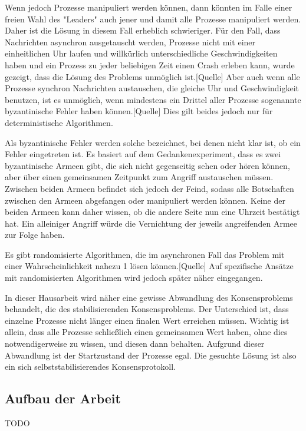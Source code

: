 \documentclass[12pt,ngerman,a4paper]{scrartcl}
\theoremstyle{plain}
\theoremstyle{definition}
\theoremstyle{remark}
\begin{document}
Wenn jedoch Prozesse manipuliert werden können, dann könnten im Falle einer freien
Wahl des "Leaders" auch jener und damit alle Prozesse manipuliert werden. Daher
ist die Lösung in diesem Fall erheblich schwieriger. Für den Fall, dass Nachrichten
asynchron ausgetauscht werden, Prozesse nicht mit einer einheitlichen Uhr
laufen und willkürlich unterschiedliche Geschwindigkeiten haben und ein Prozess
zu jeder beliebigen Zeit einen Crash erleben kann, wurde gezeigt, dass die Lösung
des Problems unmöglich ist.[Quelle] Aber auch wenn alle Prozesse synchron
Nachrichten austauschen, die gleiche Uhr und Geschwindigkeit benutzen, ist es
unmöglich, wenn mindestens ein Drittel aller Prozesse sogenannte byzantinische
Fehler haben können.[Quelle] Dies gilt beides jedoch nur für deterministische
Algorithmen.

Als byzantinische Fehler werden solche bezeichnet, bei denen nicht klar ist, ob
ein Fehler eingetreten ist. Es basiert auf dem Gedankenexperiment, dass es zwei
byzantinische Armeen gibt, die sich nicht gegenseitig sehen oder hören können,
aber über einen gemeinsamen Zeitpunkt zum Angriff austauschen müssen. Zwischen
beiden Armeen befindet sich jedoch der Feind, sodass alle Botschaften zwischen
den Armeen abgefangen oder manipuliert werden können. Keine der beiden Armeen
kann daher wissen, ob die andere Seite nun eine Uhrzeit bestätigt hat. Ein
alleiniger Angriff würde die Vernichtung der jeweils angreifenden Armee zur Folge
haben.

Es gibt randomisierte Algorithmen, die im asynchronen Fall das Problem mit einer
Wahrscheinlichkeit nahezu 1 lösen können.[Quelle] Auf spezifische Ansätze mit
randomisierten Algorithmen wird jedoch später näher eingegangen.

In dieser Hausarbeit wird näher eine gewisse Abwandlung des Konsensproblems
behandelt, die des stabilisierenden Konsensproblems. Der Unterschied ist, dass
einzelne Prozesse nicht länger einen finalen Wert erreichen müssen. Wichtig ist
allein, dass alle Prozesse schließlich einen gemeinsamen Wert haben, ohne dies
notwendigerweise zu wissen, und diesen dann behalten. Aufgrund dieser Abwandlung
ist der Startzustand der Prozesse egal. Die gesuchte Lösung ist also ein sich
selbststabilisierendes Konsensprotokoll.

\subsection{Aufbau der Arbeit}
TODO
\end{document}
